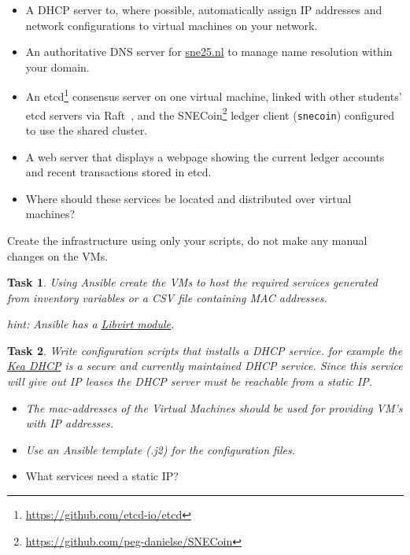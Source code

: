 \documentclass[11pt,a4paper]{exam}
\newcommand{\question}[1]{\begin{itemize}\item[$Q:$]{#1}\end{itemize}}
\newtheorem{task}{Task}
\begin{document}
\begin{itemize}
    \item A DHCP server to, where possible, automatically assign IP addresses and network configurations to virtual machines on your network.
    \item An authoritative DNS server for \url{sne25.nl} to manage name resolution within your domain.
    \item An etcd\footnote{\url{https://github.com/etcd-io/etcd}} consensus server on one virtual machine, linked with other students' etcd servers via Raft~\cite{ongaro2014search}, and the SNECoin\footnote{\url{https://github.com/peg-danielse/SNECoin}} ledger client (\texttt{snecoin}) configured to use the shared cluster.
    \item A web server that displays a webpage showing the current ledger accounts and recent transactions stored in etcd.
\end{itemize}

\question{Where should these services be located and distributed over virtual machines?}

\noindent Create the infrastructure using only your scripts, do not make any manual changes on the VMs.

\begin{task}
    Using Ansible create the VMs to host the required services generated from inventory variables or a CSV file containing MAC addresses.

    \vspace{.2cm} \noindent hint: Ansible has a \href{https://docs.ansible.com/ansible/devel/collections/community/libvirt/}{Libvirt module}.
\end{task}

\begin{task}
Write configuration scripts that installs a DHCP service. for example the \href{https://www.isc.org/kea/}{Kea DHCP} is a secure and currently maintained DHCP service. Since this service will give out IP leases the DHCP server must be reachable from a static IP.
\begin{itemize}
    \item The mac-addresses of the Virtual Machines should be used for providing VM's with IP addresses.
    \item Use an Ansible template (.j2) for the configuration files.
\end{itemize}
\end{task}

\question{What services need a static IP?}
\end{document}
